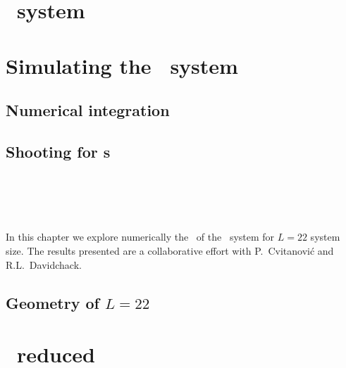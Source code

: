 \chapter{\KS\ system}
\label{chap:KSe}
    \section{\KSe}
    \label{sec:KSe}
    
%        


\chapter{Simulating the \KS\ system}
\label{chap:Numerics}
\section{Numerical integration}
	
\section{Shooting for \rpo s}
        
        


\chapter{\KS\ \statesp}
\label{chap:kseStSp}

In this chapter we explore  numerically the \statesp\ of the \KS\ system
for $L=22$ system size.
The results presented are a
collaborative effort with P.~Cvitanovi\'c and R.L.~Davidchack.

    \section{Geometry of $L=22$ \statesp}
    \label{sec:L22}
    

\chapter{\KS\ reduced \statesp}
    \label{chap:kseRedStSp}	
    


